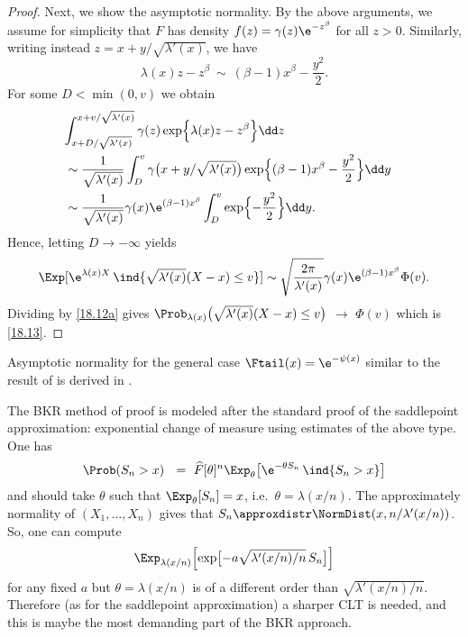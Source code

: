 \begin{proof}
	Next, we show the asymptotic normality. By the above arguments, we assume for simplicity  that $F$ has density $f(z)=\gamma(z) \e^{-z^\beta} $ for all $z>0$. Similarly,
	writing instead $z=x+y/\sqrt{\lambda'(x)}$, we have
	\[\lambda(x) z-z^\beta\ \sim \ (\beta-1)x^\beta-\frac{y^2}{2} .\]
	For some $D< \min(0,v)$ we obtain
	\begin{align*}
		\lefteqn{\int_{x+ D/\sqrt{\lambda'(x)}}^{x+ v/\sqrt{\lambda'(x)}}
			\gamma(z)\exp\Bigl\{ \lambda(x) z- z^\beta \Bigl\} \dd z}\\
		&\sim  \frac{1}{\sqrt{\lambda'(x)}} \int_{D}^v
		\gamma\big(x+ y/\sqrt{\lambda'(x)}\bigr)\exp\Bigl\{ (\beta-1)x^\beta-\frac{y^2}{2} \Bigr\}\dd y\\
		&\sim  \frac{1}{\sqrt{\lambda'(x)}} \gamma(x) \e^{(\beta-1)x^\beta}\int_{D}^{v }
		\exp\Bigl\{ {-}\frac{y^2}{2} \Bigr\}\dd y.
	\end{align*}
	Hence, letting $D\to - \infty$ yields
	$$ 	\Exp[\e^{\lambda(x)X} \, \ind{\sqrt{\lambda'(x)}(X-x)\le v}]
	\sim \sqrt{\frac{2\pi}{\lambda'(x)}} \gamma(x) \e^{(\beta-1)x^\beta}\Phi(v).
	$$
	Dividing by \eqref{18.12a} gives $\Prob_{\lambda(x)}\bigl(\sqrt{\lambda'(x)}(X-x)\le v\bigr)$ $\to$ $\Phi(v)$
	which is \eqref{18.13}.
\end{proof}



\begin{remark}\label{Rem:Lo}
	Asymptotic normality for the general case $\Ftail(x)= \e^{-\psi(x)}$ similar to the result of  is derived in \cite{balkema2003domains}.
\remQED\end{remark}


\begin{remark}\label{Rem:21.12a} The BKR method of proof is modeled after the standard
	proof of the saddlepoint approximation: exponential change of measure using estimates of the above type.
	One has
	\begin{equation}\label{21.12b}
	\Prob(S_n>x)\ \ =\ \widehat{F}[\theta]^n\Exp_\theta\bigl[\e^{-\theta S_n}\, \ind{S_n>x}\bigr]
	\end{equation}
	and should take $\theta$ such that $\Exp_\theta[S_n]=x$, i.e.\ $\theta=\lambda(x/n)$.
	The approximately normality of $(X_1,\ldots,X_n)$ gives that $S_n \approxdistr \NormDist(x,n/\lambda'(x/n))$. So, one can compute
	\[\Exp_{\lambda(x/n)} \Bigl[ \exp\bigl[-a\sqrt{\lambda'(x/n)/n}\,S_n\bigr] \Bigr] \]
	for any fixed $a$
	but $\theta=\lambda(x/n)$ is of a different order than $\sqrt{\lambda'(x/n)/n}$. Therefore
	(as for the saddlepoint approximation) a sharper CLT is needed, and
	this is maybe the most demanding part of the BKR approach.	\remQED\end{remark}\


